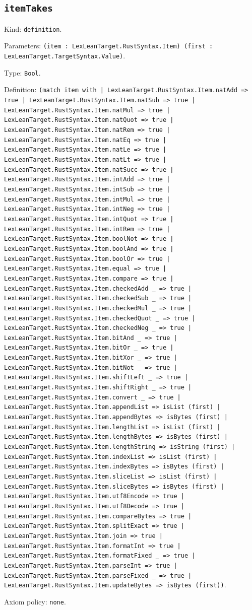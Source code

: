 \documentclass[11pt]{article}
\begin{document}
\subsection*{\texttt{itemTakes}}
\noindent Kind: \texttt{definition}.\par
\noindent Parameters: \texttt{(item : LexLeanTarget.RustSyntax.Item) (first : LexLeanTarget.TargetSyntax.Value)}.\par
\noindent Type: \texttt{Bool}.\par
\noindent Definition: \texttt{(match item with | LexLeanTarget.RustSyntax.Item.natAdd => true | LexLeanTarget.RustSyntax.Item.natSub => true | LexLeanTarget.RustSyntax.Item.natMul => true | LexLeanTarget.RustSyntax.Item.natQuot => true | LexLeanTarget.RustSyntax.Item.natRem => true | LexLeanTarget.RustSyntax.Item.natEq => true | LexLeanTarget.RustSyntax.Item.natLe => true | LexLeanTarget.RustSyntax.Item.natLt => true | LexLeanTarget.RustSyntax.Item.natSucc => true | LexLeanTarget.RustSyntax.Item.intAdd => true | LexLeanTarget.RustSyntax.Item.intSub => true | LexLeanTarget.RustSyntax.Item.intMul => true | LexLeanTarget.RustSyntax.Item.intNeg => true | LexLeanTarget.RustSyntax.Item.intQuot => true | LexLeanTarget.RustSyntax.Item.intRem => true | LexLeanTarget.RustSyntax.Item.boolNot => true | LexLeanTarget.RustSyntax.Item.boolAnd => true | LexLeanTarget.RustSyntax.Item.boolOr => true | LexLeanTarget.RustSyntax.Item.equal => true | LexLeanTarget.RustSyntax.Item.compare => true | LexLeanTarget.RustSyntax.Item.checkedAdd \_ => true | LexLeanTarget.RustSyntax.Item.checkedSub \_ => true | LexLeanTarget.RustSyntax.Item.checkedMul \_ => true | LexLeanTarget.RustSyntax.Item.checkedQuot \_ => true | LexLeanTarget.RustSyntax.Item.checkedNeg \_ => true | LexLeanTarget.RustSyntax.Item.bitAnd \_ => true | LexLeanTarget.RustSyntax.Item.bitOr \_ => true | LexLeanTarget.RustSyntax.Item.bitXor \_ => true | LexLeanTarget.RustSyntax.Item.bitNot \_ => true | LexLeanTarget.RustSyntax.Item.shiftLeft \_ => true | LexLeanTarget.RustSyntax.Item.shiftRight \_ => true | LexLeanTarget.RustSyntax.Item.convert \_ => true | LexLeanTarget.RustSyntax.Item.appendList => isList (first) | LexLeanTarget.RustSyntax.Item.appendBytes => isBytes (first) | LexLeanTarget.RustSyntax.Item.lengthList => isList (first) | LexLeanTarget.RustSyntax.Item.lengthBytes => isBytes (first) | LexLeanTarget.RustSyntax.Item.lengthString => isString (first) | LexLeanTarget.RustSyntax.Item.indexList => isList (first) | LexLeanTarget.RustSyntax.Item.indexBytes => isBytes (first) | LexLeanTarget.RustSyntax.Item.sliceList => isList (first) | LexLeanTarget.RustSyntax.Item.sliceBytes => isBytes (first) | LexLeanTarget.RustSyntax.Item.utf8Encode => true | LexLeanTarget.RustSyntax.Item.utf8Decode => true | LexLeanTarget.RustSyntax.Item.compareBytes => true | LexLeanTarget.RustSyntax.Item.splitExact => true | LexLeanTarget.RustSyntax.Item.join => true | LexLeanTarget.RustSyntax.Item.formatInt => true | LexLeanTarget.RustSyntax.Item.formatFixed \_ => true | LexLeanTarget.RustSyntax.Item.parseInt => true | LexLeanTarget.RustSyntax.Item.parseFixed \_ => true | LexLeanTarget.RustSyntax.Item.updateBytes => isBytes (first))}.\par
\noindent Axiom policy: \texttt{none}.\par
\end{document}
